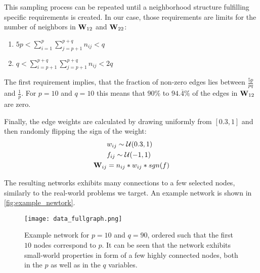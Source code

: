 This sampling process can be repeated until a neighborhood structure fulfilling specific requirements is created.
In our case, those requirements are limits for the number of neighbors in $\mathbf{W}_{12}$ and $\mathbf{W}_{22}$:
\begin{enumerate}
	\item $5p < \sum\limits_{i=1}^{p} \sum\limits_{j=p+1}^{p+q}{n}_{ij} < q$
	\item $q < \sum\limits_{i=p+1}^{p+q} \sum\limits_{j=p+1}^{p+q}{n}_{ij} < 2q$
\end{enumerate}
The first requirement implies, that the fraction of non-zero edges lies between $\frac{5p}{pq}$ and $\frac{1}{p}$.
For $p=10$ and $q=10$ this means that $90\%$ to $94.\overline{4}\%$ of the edges in $\mathbf{W}_{12}$ are zero. 

Finally, the edge weights are calculated by drawing uniformly from $[0.3,1]$ and then randomly flipping the sign of the weight:
\begin{align*}
	        & w_{ij} \sim \mathcal{U}(0.3, 1) \\
	        & f_{ij} \sim \mathcal{U}(-1,1)   
	\\
	\mathbf{W}_{ij} & = {n}_{ij} * w_{ij}  * sgn(f)   
\end{align*}

The resulting networks exhibits many connections to a few selected nodes, similarly to the real-world problems we target.
An example network is shown in \autoref{fig:example_newtork}.

\begin{figure}[H]
	\centering
	\texttt{[image: data\_fullgraph.png]}
	\caption{Example network for $p=10$ and $q=90$, ordered such that the first $10$ nodes correspond to $p$. It can be seen that the network exhibits small-world properties in form of a few highly connected nodes, both in the $p$ as well as in the $q$ variables.}
		
	\label{fig:example_newtork}
\end{figure}

